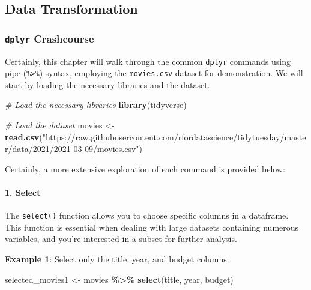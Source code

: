 \documentclass[
]{book}
\newenvironment{Shaded}{\begin{snugshade}}{\end{snugshade}}
\newcommand{\CommentTok}[1]{\textcolor[rgb]{0.56,0.35,0.01}{\textit{#1}}}
\newcommand{\FunctionTok}[1]{\textcolor[rgb]{0.13,0.29,0.53}{\textbf{#1}}}
\newcommand{\NormalTok}[1]{#1}
\newcommand{\OtherTok}[1]{\textcolor[rgb]{0.56,0.35,0.01}{#1}}
\newcommand{\SpecialCharTok}[1]{\textcolor[rgb]{0.81,0.36,0.00}{\textbf{#1}}}
\newcommand{\StringTok}[1]{\textcolor[rgb]{0.31,0.60,0.02}{#1}}
\begin{document}
\hypertarget{data-transformation}{%
\subsection*{Data Transformation}\label{data-transformation}}

\hypertarget{dplyr-crashcourse}{%
\subsubsection*{\texorpdfstring{\texttt{dplyr} Crashcourse}{dplyr Crashcourse}}\label{dplyr-crashcourse}}

Certainly, this chapter will walk through the common \texttt{dplyr} commands using pipe (\texttt{\%\textgreater{}\%}) syntax, employing the \texttt{movies.csv} dataset for demonstration. We will start by loading the necessary libraries and the dataset.

\begin{Shaded}
\begin{Highlighting}[]
\CommentTok{\# Load the necessary libraries}
\FunctionTok{library}\NormalTok{(tidyverse)}

\CommentTok{\# Load the dataset}
\NormalTok{movies }\OtherTok{\textless{}{-}} \FunctionTok{read.csv}\NormalTok{(}\StringTok{"https://raw.githubusercontent.com/rfordatascience/tidytuesday/master/data/2021/2021{-}03{-}09/movies.csv"}\NormalTok{)}
\end{Highlighting}
\end{Shaded}

Certainly, a more extensive exploration of each command is provided below:

\hypertarget{select}{%
\paragraph*{1. Select}\label{select}}

The \texttt{select()} function allows you to choose specific columns in a dataframe. This function is essential when dealing with large datasets containing numerous variables, and you're interested in a subset for further analysis.

\textbf{Example 1}: Select only the title, year, and budget columns.

\begin{Shaded}
\begin{Highlighting}[]
\NormalTok{selected\_movies1 }\OtherTok{\textless{}{-}}\NormalTok{ movies }\SpecialCharTok{\%\textgreater{}\%}
  \FunctionTok{select}\NormalTok{(title, year, budget)}
\end{Highlighting}
\end{Shaded}
\end{document}
